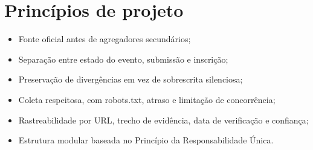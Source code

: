 \section{Princípios de projeto}

\begin{itemize}[leftmargin=*,itemsep=0.25em]
\item Fonte oficial antes de agregadores secundários;
\item Separação entre estado do evento, submissão e inscrição;
\item Preservação de divergências em vez de sobrescrita silenciosa;
\item Coleta respeitosa, com robots.txt, atraso e limitação de concorrência;
\item Rastreabilidade por URL, trecho de evidência, data de verificação e confiança;
\item Estrutura modular baseada no Princípio da Responsabilidade Única.
\end{itemize}
